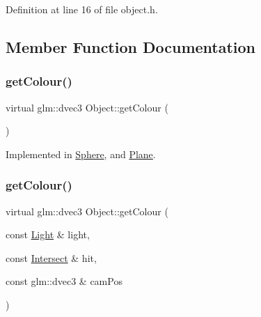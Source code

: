Definition at line 16 of file object.\+h.



\subsection{Member Function Documentation}
\mbox{\label{class_object_a96a5bb5dcad4c340caa1d806fb5bd572}} 
\subsubsection{\texorpdfstring{get\+Colour()}{getColour()}\hspace{0.1cm}{\footnotesize\ttfamily [1/2]}}
{\footnotesize\ttfamily virtual glm\+::dvec3 Object\+::get\+Colour (\begin{DoxyParamCaption}{ }\end{DoxyParamCaption})\hspace{0.3cm}{\ttfamily [pure virtual]}}



Implemented in \mbox{\hyperlink{class_sphere_a700025702852f2f6c888c7dbd720ea76}{Sphere}}, and \mbox{\hyperlink{class_plane_acd86caefd4ff1bf35f2719b1bef6afd8}{Plane}}.

\mbox{\label{class_object_abecc5668197c7222b5c9180a9738f69b}} 
\subsubsection{\texorpdfstring{get\+Colour()}{getColour()}\hspace{0.1cm}{\footnotesize\ttfamily [2/2]}}
{\footnotesize\ttfamily virtual glm\+::dvec3 Object\+::get\+Colour (\begin{DoxyParamCaption}\item[{const \mbox{\hyperlink{class_light}{Light}} \&}]{light,  }\item[{const \mbox{\hyperlink{struct_intersect}{Intersect}} \&}]{hit,  }\item[{const glm\+::dvec3 \&}]{cam\+Pos }\end{DoxyParamCaption})\hspace{0.3cm}{\ttfamily [pure virtual]}}



